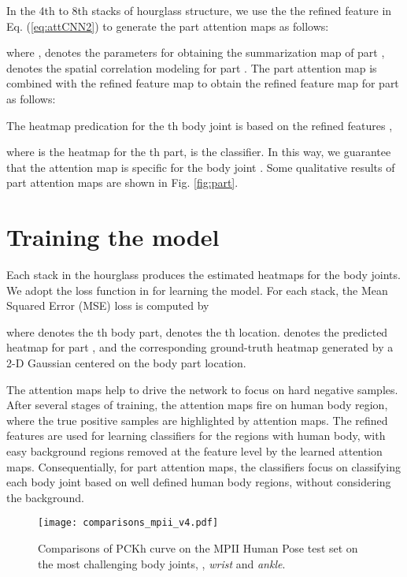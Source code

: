 \documentclass[10pt,twocolumn,letterpaper]{article}
\begin{document}
In the 4th to 8th stacks of hourglass structure, we use the the refined feature  in Eq. (\ref{eq:attCNN2}) to generate the part attention maps as follows:

where , 
 denotes the parameters for obtaining the summarization map  of part ,
 denotes the spatial correlation modeling for part .
The part attention map  is combined with the refined  feature map  to obtain the refined  feature map for part  as follows:

The heatmap predication for the th body joint is based on the refined  features ,

where  is the heatmap for the th part,  is the classifier. 
In this way, we guarantee that the attention map  is specific for the body joint . 
Some qualitative results of part attention maps are shown in Fig. \ref{fig:part}.



\section{Training the model}
Each stack in the hourglass produces the estimated heatmaps for the body joints.
We adopt the loss function in \cite{newell2016stacked} for learning the model. For each stack, the Mean Squared Error (MSE) loss is computed by

where  denotes the th body part,  denotes the th location.   denotes the predicted heatmap for part , and  the corresponding ground-truth heatmap generated by a 2-D Gaussian centered on the body part location. 




The attention maps help to drive the network to focus on hard negative samples. 
After several stages of training, the attention maps fire on human body region, where the true positive samples are highlighted by attention maps. The refined  features are used for learning classifiers for the regions with human body, with easy background regions removed at the feature level by the learned attention maps. 
Consequentially, for part attention maps, the classifiers focus on classifying each body joint based on well defined human body regions, without considering the background.





\begin{figure}[t]
\begin{center}
  \texttt{[image: comparisons\_mpii\_v4.pdf]}
\end{center}
\vspace{-1.2em}
   \caption{\small Comparisons of PCKh curve on the MPII Human Pose test set on the most challenging body joints, \ie, \textit{wrist} and \textit{ankle}. }
   \vspace{-1.1em}
\label{fig:comparisons_mpii}
\end{figure}
\end{document}
